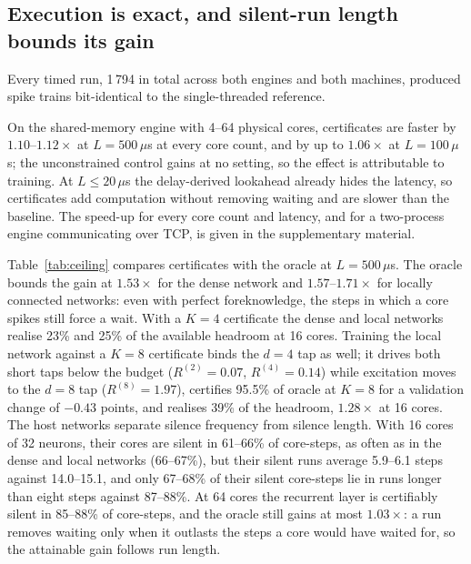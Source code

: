 \documentclass{iopjournal}
\begin{document}
\subsection{Execution is exact, and silent-run length bounds its gain}
\label{sec:execution}

Every timed run, 1\,794 in total across both engines and both machines, produced spike trains bit-identical to the single-threaded reference.

On the shared-memory engine with 4--64 physical cores, certificates are faster by $1.10$--$1.12\times$ at $L=500\,\mu$s at every core count, and by up to $1.06\times$ at $L=100\,\mu$s; the unconstrained control gains at no setting, so the effect is attributable to training. At $L\leq20\,\mu$s the delay-derived lookahead already hides the latency, so certificates add computation without removing waiting and are slower than the baseline. The speed-up for every core count and latency, and for a two-process engine communicating over TCP, is given in the supplementary material.

Table~\ref{tab:ceiling} compares certificates with the oracle at $L=500\,\mu$s. The oracle bounds the gain at $1.53\times$ for the dense network and $1.57$--$1.71\times$ for locally connected networks: even with perfect foreknowledge, the steps in which a core spikes still force a wait. With a $K=4$ certificate the dense and local networks realise 23\% and 25\% of the available headroom at 16 cores. Training the local network against a $K=8$ certificate binds the $d=4$ tap as well; it drives both short taps below the budget ($R^{(2)}=0.07$, $R^{(4)}=0.14$) while excitation moves to the $d=8$ tap ($R^{(8)}=1.97$), certifies 95.5\% of oracle at $K=8$ for a validation change of $-0.43$ points, and realises 39\% of the headroom, $1.28\times$ at 16 cores.
The host networks separate silence frequency from silence length. With 16 cores of 32 neurons, their cores are silent in 61--66\% of core-steps, as often as in the dense and local networks (66--67\%), but their silent runs average 5.9--6.1 steps against 14.0--15.1, and only 67--68\% of their silent core-steps lie in runs longer than eight steps against 87--88\%. At 64 cores the recurrent layer is certifiably silent in 85--88\% of core-steps, and the oracle still gains at most $1.03\times$: a run removes waiting only when it outlasts the steps a core would have waited for, so the attainable gain follows run length.
\end{document}
